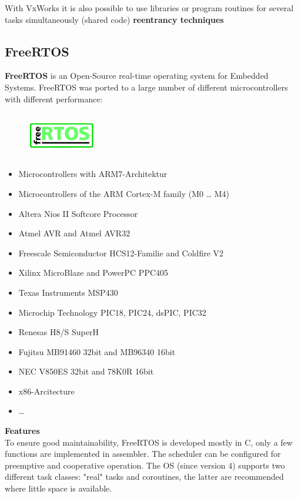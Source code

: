 With VxWorks it is also possible to use libraries or program routines for several tasks simultaneously (shared code)  \textbf{reentrancy techniques}
\newpage

\subsection{ FreeRTOS}

\textbf{FreeRTOS} is an Open-Source  real-time operating system for Embedded Systems. FreeRTOS was ported to a large number  of different microcontrollers with different performance:

 	\begin{figure}[h]
    \centering
    \includegraphics[width=3cm, height=2cm]{Images/image129.png}
    \label{fig:Fig }
    \end{figure}
    
\begin{itemize}
\item  Microcontrollers with ARM7-Architektur
\item  Microcontrollers of the ARM Cortex-M family (M0 {\dots} M4)
\item  Altera Nios II Softcore Processor
\item  Atmel AVR and Atmel AVR32
\item  Freescale Semiconductor HCS12-Familie and Coldfire V2
\item  Xilinx MicroBlaze and PowerPC PPC405
\item  Texas Instruments MSP430
\item  Microchip Technology PIC18, PIC24, dsPIC, PIC32
\item  Renesas H8/S SuperH
\item  Fujitsu MB91460 32bit and MB96340 16bit
\item  NEC V850ES 32bit and 78K0R 16bit
\item  x86-Arcitecture
\item  {\dots}
\end{itemize}

\textbf{Features}\\

To ensure good maintainability, FreeRTOS is developed mostly in C, only a few functions are implemented in assembler. The scheduler can be configured for preemptive and cooperative operation. The OS (since version 4) supports two different task classes: "real" tasks and coroutines, the latter are recommended where little space is available.\\

